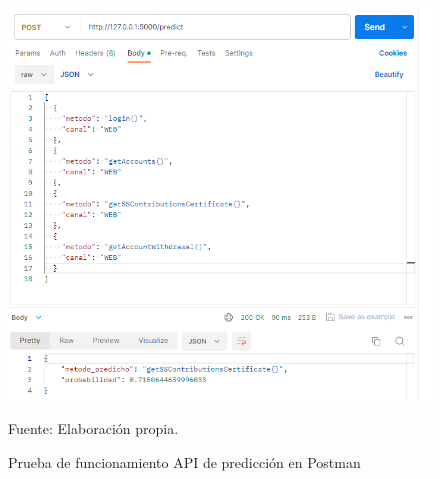 \begin{figure}[H]
    \begin{minipage}[t]{0.9\textwidth}
        \caption{Prueba de funcionamiento API de predicción en Postman}
        \label{API_test}        
    \end{minipage}

    \vspace{10pt}

    \begin{minipage}[b]{1\textwidth}
        \centering
        \includegraphics[width=\textwidth]{img/postman.png}        
    \end{minipage}

    \begin{minipage}[t]{0.9\textwidth}
        Fuente: Elaboración propia.
    \end{minipage}
\end{figure}

